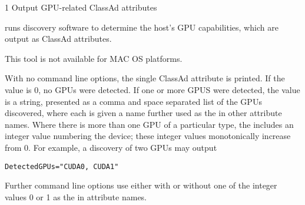 \begin{ManPage}{\label{man-condor-gpu-discovery}}{1}
{Output GPU-related ClassAd attributes}
\Synopsis {}



\Description

 runs discovery software to determine
the host's GPU capabilities,
which are output as ClassAd attributes.

This tool is not available for MAC OS platforms.

With no command line options, the single ClassAd attribute
 is printed.
If the value is 0, no GPUs were detected.
If one or more GPUS were detected, the value is 
a string, presented as a comma and space separated list of the GPUs discovered,
where each is given a name further used as the  in other
attribute names.
Where there is more than one GPU of a particular type, 
the  includes an integer value numbering the device;
these integer values monotonically increase from 0. 
For example, a discovery of two GPUs may output
\begin{verbatim}
DetectedGPUs="CUDA0, CUDA1"
\end{verbatim}
Further command line options use  either with or without one of
the integer values 0 or 1 as the  in
attribute names.


\end{ManPage}
